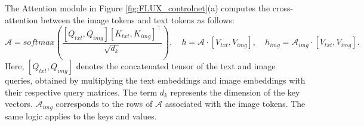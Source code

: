 \documentclass{article}
\begin{document}




The Attention module in Figure \ref{fig:FLUX_controlnet}(a) computes the cross-attention between the image tokens and text tokens as follows:
\begin{equation}
\mathcal{A} = \textit{softmax}\left(\frac{[Q_{txt}, Q_{img}] [K_{txt}, K_{img}]^\top}{\sqrt{d_k}}\right),\quad 
h =  \mathcal{A} \cdot [V_{txt}, V_{img}],\quad 
h_{img} = \mathcal{A}_{img} \cdot [V_{txt}, V_{img}].
\label{eq:FLUX_attention}
\end{equation}
Here, $[Q_{txt}, Q_{img}]$ denotes the concatenated tensor of the text and image queries, obtained by multiplying the text embeddings and image embeddings with their respective query matrices. The term $d_k$ represents the dimension of the key vectors. $\mathcal{A}_{img}$ corresponds to the rows of $\mathcal{A}$ associated with the image tokens. The same logic applies to the keys and values.
\end{document}

